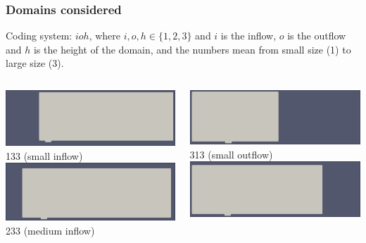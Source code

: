 \documentclass[
	aspectratio=169, %
	t, %
	onlytextwidth, %
	10pt, %
]{beamer}
\begin{document}
\begin{frame}
	\frametitle{Domains considered}
	Coding system: $ioh$, where $i, o, h\in \{1, 2, 3\}$ and $i$ is the inflow, $o$ is the outflow and $h$ is the height of the domain, and the numbers mean from small size (1) to large size (3).

	\small %
	\begin{columns}[T] %
		\begin{column}{0.3\linewidth} %
			\includegraphics[width=\linewidth]{Images/133.png}
			{\tiny\textcolor{ICLBlue}{133 (small inflow)}}\\[2pt]
			\includegraphics[width=\linewidth]{Images/233.png}
			{\tiny\textcolor{ICLBlue}{233 (medium inflow)}}\\[2pt]
		\end{column}
		\begin{column}{0.3\linewidth} %
			\includegraphics[width=\linewidth]{Images/313.png}
			{\tiny\textcolor{ICLBlue}{313 (small outflow)}}\\[2pt]
			\includegraphics[width=\linewidth]{Images/323.png}

\end{column}
\end{columns}
\end{frame}
\end{document}
